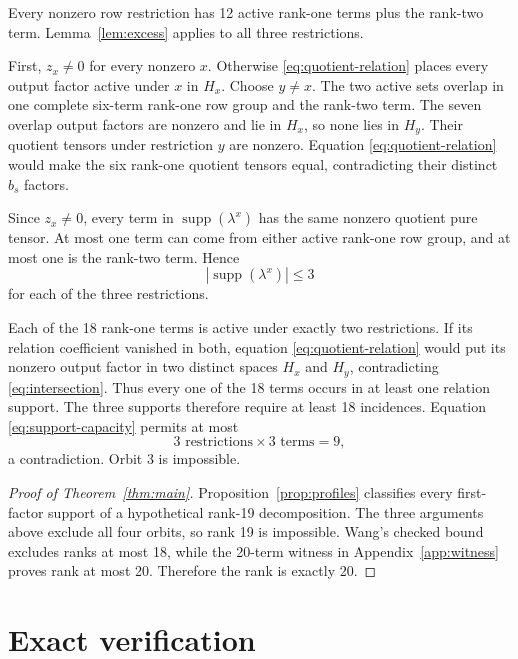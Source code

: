 \documentclass[10pt]{article}
\theoremstyle{remark}
\newcommand{\supp}{\operatorname{supp}}
\begin{document}
Every nonzero row restriction has 12 active rank-one terms plus the rank-two
term.  Lemma~\ref{lem:excess} applies to all three restrictions.

First, $z_x\neq0$ for every nonzero $x$.  Otherwise
\eqref{eq:quotient-relation} places every output factor active under $x$ in
$H_x$.  Choose $y\neq x$.  The two active sets overlap in one complete
six-term rank-one row group and the rank-two term.  The seven overlap output
factors are nonzero and lie in $H_x$, so none lies in $H_y$.  Their quotient
tensors under restriction $y$ are nonzero.  Equation
\eqref{eq:quotient-relation} would make the six rank-one quotient tensors equal,
contradicting their distinct $b_s$ factors.

Since $z_x\neq0$, every term in $\supp(\lambda^x)$ has the same nonzero
quotient pure tensor.  At most one term can come from either active rank-one
row group, and at most one is the rank-two term.  Hence
\begin{equation}\label{eq:support-capacity}
 |\supp(\lambda^x)|\leq3
\end{equation}
for each of the three restrictions.

Each of the 18 rank-one terms is active under exactly two restrictions.  If
its relation coefficient vanished in both, equation
\eqref{eq:quotient-relation} would put its nonzero output factor in two distinct
spaces $H_x$ and $H_y$, contradicting \eqref{eq:intersection}.  Thus every one
of the 18 terms occurs in at least one relation support.  The three supports
therefore require at least 18 incidences.  Equation
\eqref{eq:support-capacity} permits at most
\[
 3\text{ restrictions}\times3\text{ terms}=9,
\]
a contradiction.  Orbit 3 is impossible.

\begin{proof}[Proof of Theorem~\ref{thm:main}]
Proposition~\ref{prop:profiles} classifies every first-factor support of a
hypothetical rank-19 decomposition.  The three arguments above exclude all
four orbits, so rank 19 is impossible.  Wang's checked bound excludes ranks at
most 18, while the 20-term witness in Appendix~\ref{app:witness} proves rank at
most 20.  Therefore the rank is exactly 20.
\end{proof}

\section{Exact verification}\label{sec:verification}
\end{document}
